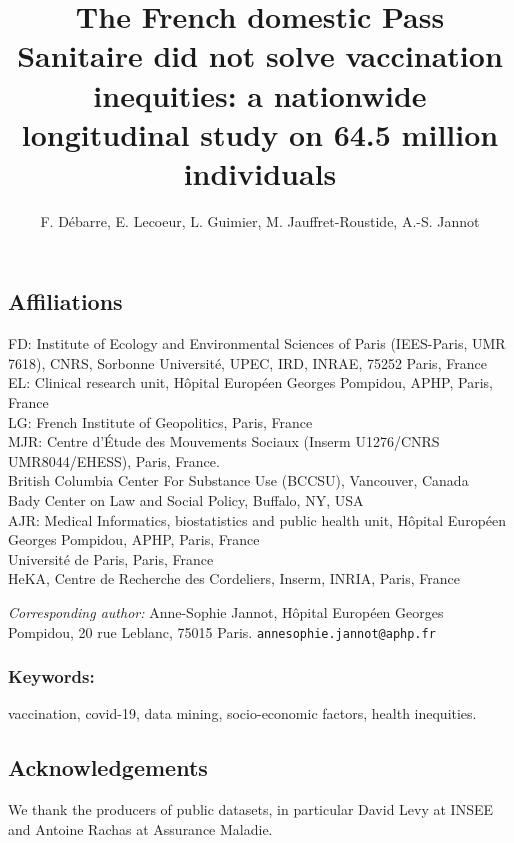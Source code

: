 \documentclass[
]{article}
\title{The French domestic Pass Sanitaire did not solve vaccination
inequities: a nationwide longitudinal study on 64.5 million individuals}
\author{F. Débarre, E. Lecoeur, L. Guimier, M. Jauffret-Roustide, A.-S.
Jannot}
\date{}
\begin{document}
\maketitle

\hypertarget{affiliations}{%
\subsection{Affiliations}\label{affiliations}}

FD: Institute of Ecology and Environmental Sciences of Paris
(IEES-Paris, UMR 7618), CNRS, Sorbonne Université, UPEC, IRD, INRAE,
75252 Paris, France\\
EL: Clinical research unit, Hôpital Européen Georges Pompidou, APHP,
Paris, France\\
LG: French Institute of Geopolitics, Paris, France\\
MJR: Centre d'Étude des Mouvements Sociaux (Inserm U1276/CNRS
UMR8044/EHESS), Paris, France.\\
British Columbia Center For Substance Use (BCCSU), Vancouver, Canada\\
Bady Center on Law and Social Policy, Buffalo, NY, USA\\
AJR: Medical Informatics, biostatistics and public health unit, Hôpital
Européen Georges Pompidou, APHP, Paris, France\\
Université de Paris, Paris, France\\
HeKA, Centre de Recherche des Cordeliers, Inserm, INRIA, Paris, France

\emph{Corresponding author:} Anne-Sophie Jannot, Hôpital Européen
Georges Pompidou, 20 rue Leblanc, 75015 Paris.
\texttt{annesophie.jannot@aphp.fr}

\hypertarget{keywords}{%
\subsubsection{Keywords:}\label{keywords}}

vaccination, covid-19, data mining, socio-economic factors, health
inequities.

\hypertarget{acknowledgements}{%
\subsection{Acknowledgements}\label{acknowledgements}}

We thank the producers of public datasets, in particular David Levy at
INSEE and Antoine Rachas at Assurance Maladie.
\end{document}

